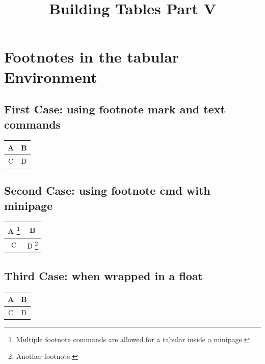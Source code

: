 \documentclass{article}
\title{\Huge Building Tables Part V}
\date{}
\begin{document}
	\maketitle
	
	\section{Footnotes in the tabular Environment}
	
	\subsection{First Case: using footnote mark and 			text commands}
	\begin{center}
		\begin{tabular}{|c|c|}
			\hline A & B \footnotemark \\
			\hline C & D \\ \hline
		\end{tabular}
	\end{center}	
	
	\bigskip
	
	\subsection{Second Case: using footnote cmd with 			minipage}
	\begin{minipage}{\linewidth}
		\hspace{5cm}
		\begin{tabular}{|c|c|}
			\hline A \footnote{Multiple footnote
				commands are allowed for a tabular
				inside a minipage.} & B \\
			\hline C & D  \footnote{Another footnote.} 				\\ \hline
		\end{tabular}
	\end{minipage}
	
	\bigskip	
	
	\subsection{Third Case: when wrapped in a float}
	\begin{table}[h]
		\centering
		\begin{tabular}{|c|c|}
			\hline A & B \footnotemark[2] \\
			\hline C & D \footnotemark[3] \\ \hline
		\end{tabular}	
	\end{table}
	
\end{document}
